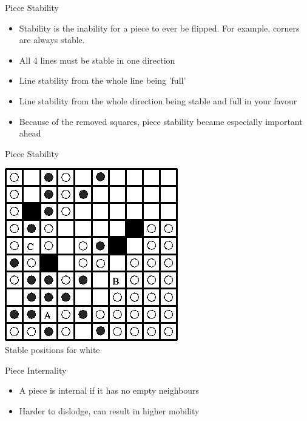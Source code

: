 \documentclass{beamer}
\begin{document}
\begin{frame}{Piece Stability}
    \begin{itemize}
  \item
  Stability is the inability for a piece to ever be flipped. For example, corners are always stable.
  \item
   All 4 lines must be stable in one direction
  \item
   Line stability from the whole line being 'full'
  \item
   Line stability from the whole direction being stable and full in your favour
  \item
    Because of the removed squares, piece stability became especially important ahead
  \end{itemize}

\end{frame}

\begin{frame}{Piece Stability}
\begin{center}
\includegraphics[scale=0.50]{stability.PNG}\\
Stable positions for white
\end{center}
\end{frame}

\begin{frame}{Piece Internality}
    \begin{itemize}
  \item
  A piece is internal if it has no empty neighbours
  \item
   Harder to dislodge, can result in higher mobility
  \end{itemize}
\end{frame}
\end{document}
